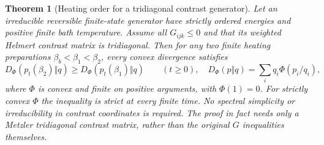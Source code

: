 \documentclass[11pt]{article}
\newtheorem{theorem}{Theorem}
\begin{document}
\begin{theorem}[Heating order for a tridiagonal contrast generator]
\label{thm:contrastchainentropy}
Let an irreducible reversible finite-state generator have strictly ordered
energies and positive finite bath temperature. Assume all $G_{ijk}\leq0$
and that its weighted Helmert contrast matrix is tridiagonal. Then for
any two finite heating preparations
$\beta_b<\beta_1<\beta_2$, every convex divergence satisfies
\[
D_\Phi(p_t(\beta_2)\Vert q)
\geq D_\Phi(p_t(\beta_1)\Vert q)
\qquad(t\geq0),
\quad
D_\Phi(p\Vert q)=\sum_iq_i\Phi(p_i/q_i),
\]
where $\Phi$ is convex and finite on positive arguments, with $\Phi(1)=0$.
For strictly convex $\Phi$ the inequality is strict at every finite time.
No spectral simplicity or irreducibility in contrast coordinates is
required. The proof in fact needs only a Metzler tridiagonal contrast
matrix, rather than the original $G$ inequalities themselves.
\end{theorem}
\end{document}
